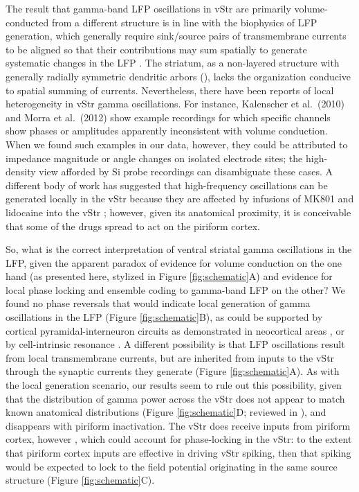 \documentclass[11pt]{article}
\let\cite=\citep
\let\citeNP=\citealt
\begin{document}
The result that gamma-band LFP oscillations in vStr are primarily
volume-conducted from a different structure is in line with the
biophysics of LFP generation, which generally require sink/source
pairs of transmembrane currents to be aligned so that their
contributions may sum spatially to generate systematic changes in the
LFP \cite{Nunez2006,Buzsaki2012}. The striatum, as a non-layered
structure with generally radially symmetric dendritic arbors
(\citeNP{Kawaguchi1995, Tepper2004, Tepper2010}), lacks the
organization conducive to spatial summing of currents. Nevertheless,
there have been reports of local heterogeneity in vStr gamma
oscillations. For instance, Kalenscher et al.\ (2010) and Morra et
al.\ (2012) show example recordings for which specific channels show
phases or amplitudes apparently inconsistent with volume
conduction. When we found such examples in our data, however, they
could be attributed to impedance magnitude or angle changes on
isolated electrode sites; the high-density view afforded by Si probe
recordings can disambiguate these cases. A different body of work has
suggested that high-frequency oscillations can be generated locally in
the vStr because they are affected by infusions of MK801 and lidocaine
into the vStr \cite{Hunt2009a,Olszewski2013}; however, given its
anatomical proximity, it is conceivable that some of the drugs spread
to act on the piriform cortex.

So, what is the correct interpretation of ventral striatal gamma
oscillations in the LFP, given the apparent paradox of evidence for
volume conduction on the one hand (as presented here, stylized in
Figure \ref{fig:schematic}A) and evidence for local phase locking and
ensemble coding to gamma-band LFP on the other? We found no phase
reversals that would indicate local generation of gamma oscillations
in the LFP (Figure \ref{fig:schematic}B), as could be supported by
cortical pyramidal-interneuron circuits as demonstrated in neocortical
areas \cite{Cardin2009,Sohal2009,Siegle2014}, or by cell-intrinsic
resonance \cite{Taverna2007}. A different possibility is that LFP
oscillations result from local transmembrane currents, but are
inherited from inputs to the vStr through the synaptic currents they
generate (Figure \ref{fig:schematic}A). As with the local generation
scenario, our results seem to rule out this possibility, given that
the distribution of gamma power across the vStr does not appear to
match known anatomical distributions (Figure \ref{fig:schematic}D;
reviewed in \citeNP{Groenewegen1999, Humphries2010}), and disappears
with piriform inactivation. The vStr does receive inputs from piriform
cortex, however \cite{Brog1993,Schwabe2004}, which could account for
phase-locking in the vStr: to the extent that piriform cortex inputs
are effective in driving vStr spiking, then that spiking would be
expected to lock to the field potential originating in the same source
structure (Figure \ref{fig:schematic}C).
\end{document}
